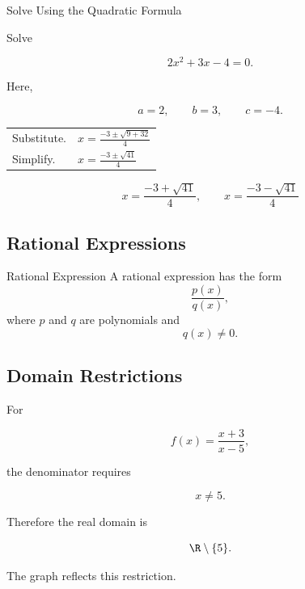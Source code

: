 \begin{workedexamplebox}{Solve Using the Quadratic Formula}

Solve

\[ 2x^2+3x-4=0. \]

Here,

\[ a=2,\qquad b=3,\qquad c=-4. \]

\begin{tabularx}{\textwidth}{@{}>{\raggedright\arraybackslash}p{}X@{}}
Substitute. &
\(x=\frac{-3\pm\sqrt{9+32}}4\)\\
Simplify. &
\(x=\frac{-3\pm\sqrt{41}}4\)
\end{tabularx}

\begin{answerbox}
\[ x=\frac{-3+\sqrt{41}}4,\qquad x=\frac{-3-\sqrt{41}}4 \]
\end{answerbox}
\end{workedexamplebox}

\subsection{Rational Expressions}
\label{subsec:rational-expressions}

\begin{definitionbox}{Rational Expression}
A rational expression has the form
\[ \frac{p(x)}{q(x)}, \]
where \(p\) and \(q\) are polynomials and
\[ q(x)\neq0. \]
\end{definitionbox}

\subsection{Domain Restrictions}
\label{subsec:rational-domain-restrictions}

For

\[ f(x)=\frac{x+3}{x-5}, \]

the denominator requires

\[ x\neq5. \]

Therefore the real domain is

\[ \R\setminus\{5\}. \]

The graph reflects this restriction.

\begin{center}
\end{center}

